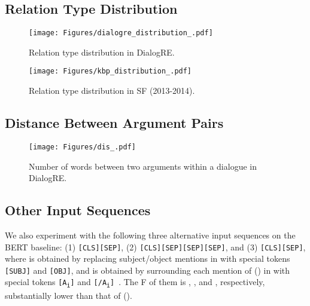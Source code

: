 \documentclass[11pt,a4paper]{article}
\begin{document}
\subsection{Relation Type Distribution}
\label{sec:reltypedist}

\begin{figure}[h!]
   \begin{center}
   \texttt{[image: Figures/dialogre\_distribution\_.pdf]}
   \end{center}
 \caption{Relation type distribution in DialogRE.}
 \label{fig:typedre}
\end{figure}



\begin{figure}[h!]
   \begin{center}
   \texttt{[image: Figures/kbp\_distribution\_.pdf]}
   \end{center}
\caption{Relation type distribution in SF (2013-2014).} 
\label{fig:typesf}
\end{figure}



\subsection{Distance Between Argument Pairs}
\label{sec:argdist}

\begin{figure}[th!]
   \begin{center}
   \texttt{[image: Figures/dis\_.pdf]}
   \end{center}
\caption{Number of words between two arguments within a dialogue in DialogRE.} 
\label{fig:distance}
\end{figure}


\subsection{Other Input Sequences}
\label{sec:input_sequence}
We also experiment with the following three alternative input sequences on the BERT baseline: (1) \texttt{[CLS]}\texttt{[SEP]}, (2) \texttt{[CLS]}\texttt{[SEP]}\texttt{[SEP]}\texttt{[SEP]}, and (3) \texttt{[CLS]}\texttt{[SEP]}, where  is obtained by replacing subject/object mentions in  with special tokens \texttt{[SUBJ]} and \texttt{[OBJ]}, and  is obtained by surrounding each mention of  () in  with special tokens \texttt{[A\textsubscript{i}]} and \texttt{[/A\textsubscript{i}]}~\cite{baldini2019matching}. The F of them is ,  , and , respectively, substantially lower than that of  (). 
\end{document}
